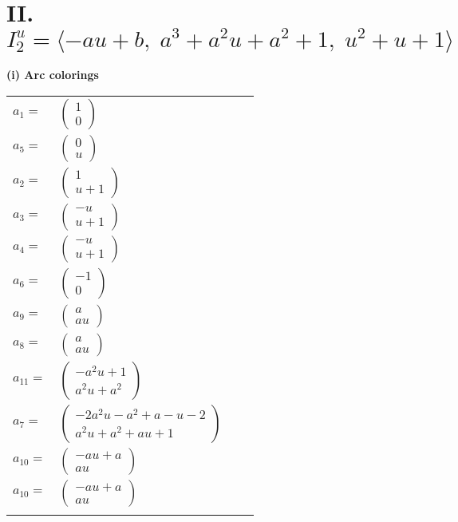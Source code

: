 \documentclass[1p]{elsarticle_modified}
\theoremstyle{definition}
\begin{document}
\centering \section*{II. $I^u_{2}= \langle - a u+b,\;a^3+a^2 u+a^2+1,\;u^2+u+1 \rangle$}
\flushleft \textbf{(i) Arc colorings}\\
\begin{tabular}{m{7pt} m{180pt} m{7pt} m{180pt} }
\flushright $a_{1}=$&$\begin{pmatrix}1\\0\end{pmatrix}$ \\
\flushright $a_{5}=$&$\begin{pmatrix}0\\u\end{pmatrix}$ \\
\flushright $a_{2}=$&$\begin{pmatrix}1\\u+1\end{pmatrix}$ \\
\flushright $a_{3}=$&$\begin{pmatrix}- u\\u+1\end{pmatrix}$ \\
\flushright $a_{4}=$&$\begin{pmatrix}- u\\u+1\end{pmatrix}$ \\
\flushright $a_{6}=$&$\begin{pmatrix}-1\\0\end{pmatrix}$ \\
\flushright $a_{9}=$&$\begin{pmatrix}a\\a u\end{pmatrix}$ \\
\flushright $a_{8}=$&$\begin{pmatrix}a\\a u\end{pmatrix}$ \\
\flushright $a_{11}=$&$\begin{pmatrix}- a^2 u+1\\a^2 u+a^2\end{pmatrix}$ \\
\flushright $a_{7}=$&$\begin{pmatrix}-2 a^2 u- a^2+a- u-2\\a^2 u+a^2+a u+1\end{pmatrix}$ \\
\flushright $a_{10}=$&$\begin{pmatrix}- a u+a\\a u\end{pmatrix}$\\ \flushright $a_{10}=$&$\begin{pmatrix}- a u+a\\a u\end{pmatrix}$\\&\end{tabular}
\end{document}
